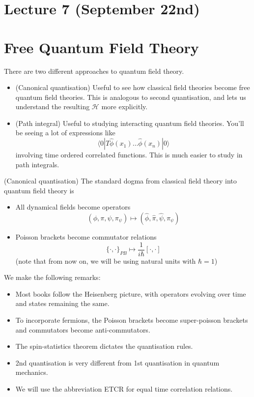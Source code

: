 \section{Lecture 7 (September 22nd)}
\section{Free Quantum Field Theory}
\begin{rmk}
There are two different approaches to quantum field theory.
\begin{itemize}
\item[(i)] (Canonical quantisation) Useful to see how classical field theories become free quantum field theories. This is analogous to second quantisation, and lets us understand the resulting $\mathcal{H}$ more explicitly.
\item[(ii)] (Path integral) Useful to studying interacting quantum field theories. You'll be seeing a lot of expressions like
\[\langle 0|T\hat{\phi }(x_1)\ldots \hat{\phi }(x_{n})|0\rangle \]
involving time ordered correlated functions. This is much easier to study in path integrals.
\end{itemize}
\end{rmk}
\vspace{2ex}
\begin{defi}
(Canonical quantisation) The standard dogma from classical field theory into quantum field theory is
\begin{itemize}
\item[(i)] All dynamical fields become operators
\[(\phi,\pi ,\psi ,\pi _{\psi })\mapsto (\hat{\phi },\hat{\pi },\hat{\psi },\hat{\pi }_{\psi })\]
\item[(ii)] Poisson brackets become commutator relations
\[\{\cdot ,\cdot \}_{PB}\mapsto \dfrac{1}{i\hbar }[\cdot ,\cdot ]\]
(note that from now on, we will be using natural units with $\hbar =1$)
\end{itemize}
\end{defi}
\vspace{2ex}
\begin{rmk}
We make the following remarks: 
\begin{itemize}
\item[(i)] Most books follow the Heisenberg picture, with operators evolving over time and states remaining the same.
\item[(ii)] To incorporate fermions, the Poisson brackets become super-poisson brackets and commutators become anti-commutators.
\item[(iii)] The spin-statistics theorem dictates the quantisation rules.
\item[(iv)] 2nd quantisation is very different from 1st quantisation in quantum mechanics. 
\item[(v)] We will use the abbreviation ETCR for equal time correlation relations.
\end{itemize}
\end{rmk}
